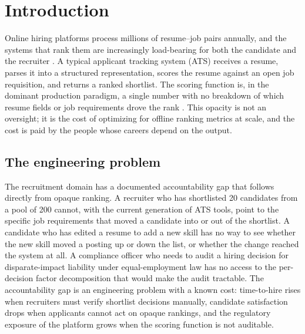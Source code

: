 \section{Introduction}\label{sec:1}

Online hiring platforms process millions of resume--job pairs annually, and the systems that rank them are increasingly load-bearing for both the candidate and the recruiter \citep{tang2025explainable}.
A typical applicant tracking system (ATS) receives a resume, parses it into a structured representation, scores the resume against an open job requisition, and returns a ranked shortlist.
The scoring function is, in the dominant production paradigm, a single number with no breakdown of which resume fields or job requirements drove the rank \citep{koren2009matrix,he2017neural}.
This opacity is not an oversight; it is the cost of optimizing for offline ranking metrics at scale, and the cost is paid by the people whose careers depend on the output.

\subsection{The engineering problem}\label{sec:1.1}
The recruitment domain has a documented accountability gap that follows directly from opaque ranking.
A recruiter who has shortlisted 20 candidates from a pool of 200 cannot, with the current generation of ATS tools, point to the specific job requirements that moved a candidate into or out of the shortlist.
A candidate who has edited a resume to add a new skill has no way to see whether the new skill moved a posting up or down the list, or whether the change reached the system at all.
A compliance officer who needs to audit a hiring decision for disparate-impact liability under equal-employment law \citep{raub2018bots,ajunwa2021paradox} has no access to the per-decision factor decomposition that would make the audit tractable.
The accountability gap is an engineering problem with a known cost: time-to-hire rises when recruiters must verify shortlist decisions manually, candidate satisfaction drops when applicants cannot act on opaque rankings, and the regulatory exposure of the platform grows when the scoring function is not auditable.

